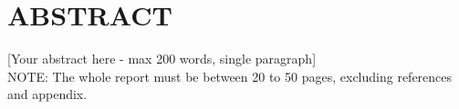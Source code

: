 \section*{ABSTRACT}

[Your abstract here - max 200 words, single paragraph]\\

NOTE: The whole report must be between 20 to 50 pages, excluding references and appendix.

\clearpage
